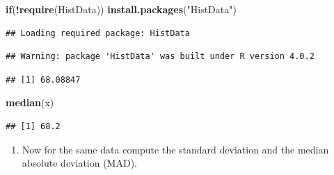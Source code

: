 \documentclass[
]{article}
\newenvironment{Shaded}{\begin{snugshade}}{\end{snugshade}}
\newcommand{\ControlFlowTok}[1]{\textcolor[rgb]{0.13,0.29,0.53}{\textbf{#1}}}
\newcommand{\KeywordTok}[1]{\textcolor[rgb]{0.13,0.29,0.53}{\textbf{#1}}}
\newcommand{\NormalTok}[1]{#1}
\newcommand{\OperatorTok}[1]{\textcolor[rgb]{0.81,0.36,0.00}{\textbf{#1}}}
\newcommand{\StringTok}[1]{\textcolor[rgb]{0.31,0.60,0.02}{#1}}
\providecommand{\tightlist}{%
  \setlength{\itemsep}{0pt}\setlength{\parskip}{0pt}}
\begin{document}
\begin{Shaded}
\begin{Highlighting}[]
\ControlFlowTok{if}\NormalTok{(}\OperatorTok{!}\KeywordTok{require}\NormalTok{(HistData)) }\KeywordTok{install.packages}\NormalTok{(}\StringTok{"HistData"}\NormalTok{)}
\end{Highlighting}
\end{Shaded}

\begin{verbatim}
## Loading required package: HistData
\end{verbatim}

\begin{verbatim}
## Warning: package 'HistData' was built under R version 4.0.2
\end{verbatim}

\begin{Shaded}
\end{Shaded}

\begin{verbatim}
## [1] 68.08847
\end{verbatim}

\begin{Shaded}
\begin{Highlighting}[]
\KeywordTok{median}\NormalTok{(x)}
\end{Highlighting}
\end{Shaded}

\begin{verbatim}
## [1] 68.2
\end{verbatim}

\begin{enumerate}
\def\labelenumi{\arabic{enumi}.}
\setcounter{enumi}{1}
\tightlist
\item
  Now for the same data compute the standard deviation and the median
  absolute deviation (MAD).
\end{enumerate}

\begin{Shaded}
\end{Shaded}
\end{document}
